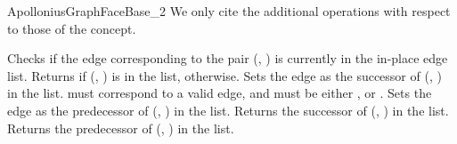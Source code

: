\begin{ccRefConcept}{ApolloniusGraphFaceBase_2}
We only cite the additional operations with respect to those of the
 concept.

%
%
{Checks if the edge corresponding to the pair (, )
is currently in the in-place edge list. Returns  if
(, ) is in the list,  otherwise.
}
\ccGlue
{}
{Sets the edge  as the successor of
(, ) in the list.
\ccPrecond {} must correspond to a valid edge, and 
must be either ,  or .}
\ccGlue
{}
{Sets the edge  as the predecessor of
(, ) in the list.
}
\ccGlue
{}
{Returns the successor of (, ) in the list.
}
\ccGlue
{}
{Returns the predecessor of (, ) in the list.
}


\ccHasModels
{}


\ccSeeAlso
{}\\
\\
\\

\end{ccRefConcept}

